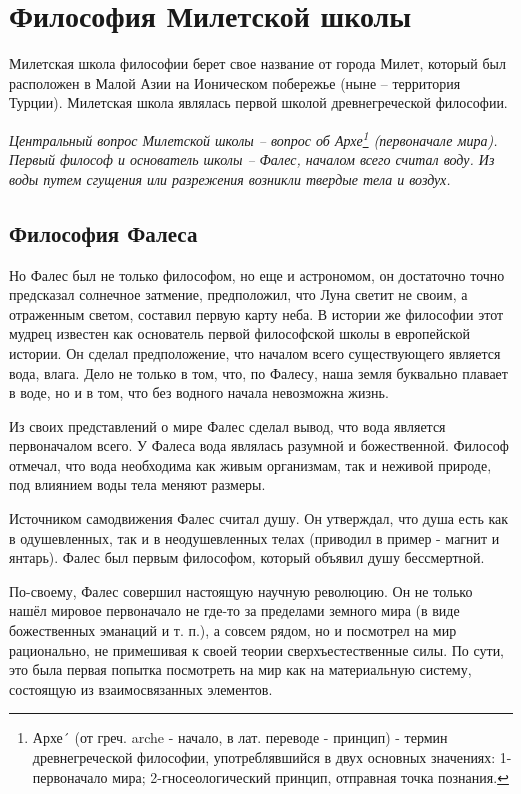 \chapter{Философия Милетской школы}

Милетская школа философии берет свое название от города Милет, который
был расположен в Малой Азии на Ионическом побережье (ныне -- территория
Турции). Милетская школа являлась первой школой древнегреческой
философии.

\emph{Центральный вопрос Милетской школы -- вопрос об Архе\footnote{Архе´
    (от греч. arche - начало, в лат. переводе - принцип) - термин
    древнегреческой философии, употреблявшийся в двух основных значениях:
    1-первоначало мира; 2-гносеологический принцип, отправная точка
    познания.} (первоначале мира). Первый философ и основатель школы --
  Фалес, началом всего считал воду. Из воды путем сгущения или разрежения
  возникли твердые тела и воздух.}

\section{Философия Фалеса}

Но Фалес был не только философом, но еще и астрономом, он достаточно
точно пред­сказал солнечное затмение, предположил, что Луна светит не
своим, а отраженным светом, составил первую карту неба. В ис­тории же
философии этот мудрец известен как основатель пер­вой философской школы
в европейской истории. Он сделал предположение, что началом всего
существующего является вода, влага. Дело не только в том, что, по
Фалесу, наша земля буквально плавает в воде, но и в том, что без водного
начала невозможна жизнь.

Из своих представлений о мире Фалес сделал вывод, что вода является
первоначалом всего. У Фалеса вода являлась разумной и божественной.
Философ отмечал, что вода необходима как живым организмам, так и неживой
природе, под влиянием воды тела меняют размеры.

Источником самодвижения Фалес считал душу. Он утверждал, что душа есть
как в одушевленных, так и в неодушевленных телах (приводил в пример -
магнит и янтарь). Фалес был первым философом, который объявил душу
бессмертной.

По-своему, Фалес совершил настоящую научную революцию. Он не только
нашёл мировое первоначало не где-то за пределами земного мира (в виде
божественных эманаций и т. п.), а совсем рядом, но и посмотрел на мир
рационально, не примешивая к своей теории сверхъестественные силы. По
сути, это была первая попытка посмотреть на мир как на материальную
систему, состоящую из взаимосвязанных элементов.


